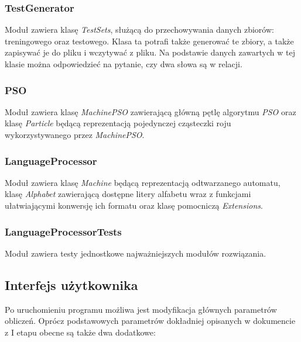 \documentclass{../llncs_template_final/llncs}
\begin{document}
\subsubsection*{TestGenerator}
Moduł zawiera klasę \emph{TestSets}, służącą do przechowywania danych zbiorów: treningowego oraz testowego. Klasa ta potrafi także generować te zbiory, a także zapisywać je do pliku i wczytywać z pliku. Na podstawie danych zawartych w tej klasie można odpowiedzieć na pytanie, czy dwa słowa są w relacji.

\subsubsection*{PSO}
Moduł zawiera klasę \emph{MachinePSO} zawierającą główną pętlę algorytmu \emph{PSO} oraz klasę \emph{Particle} będącą reprezentacją pojedynczej cząsteczki roju wykorzystywanego przez \emph{MachinePSO}.

\subsubsection*{LanguageProcessor}
Moduł zawiera klasę \emph{Machine} będącą reprezentacją odtwarzanego automatu, klasę \emph{Alphabet} zawierającą dostępne litery alfabetu wraz z funkcjami ułatwiającymi konwersję ich formatu oraz klasę pomocniczą \emph{Extensions}.

\subsubsection*{LanguageProcessorTests}
Moduł zawiera testy jednostkowe najważniejszych modułów rozwiązania.

\subsection{Interfejs użytkownika}
Po uruchomieniu programu możliwa jest modyfikacja głównych parametrów obliczeń. Oprócz podstawowych parametrów dokładniej opisanych w dokumencie z I etapu obecne są także dwa dodatkowe:
\end{document}

